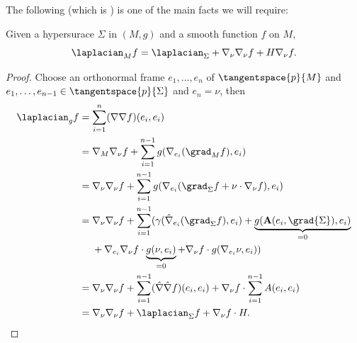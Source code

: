 \documentclass[titlepage,numbers=noenddot,headinclude,oneside,%
footinclude=true,cleardoublepage=empty,%
BCOR=5mm,paper=a4,fontsize=11pt,%
english,%
]{scrartcl}
\begin{document}
{The following (which is \parencite[Exercise 2.3 in][]{leeGeometricRelativity2019}) is one of the main facts we will require:
\begin{fact}
    Given a hypersurace \( \Sigma \) in \( (M,g) \) and a smooth function \( f \) on \( M \),
    \begin{equation*}
        \laplacian_M f=\laplacian_\Sigma +\Mconnection_\nu\Mconnection_\nu f+H \Mconnection_\nu f.
    \end{equation*}
\end{fact}
\begin{proof}
    Choose an orthonormal frame \( e_1,\dotsc,e_n \) of \( \tangentspace{p}{M} \) and \( e_1,\dotsc,e_{n-1}\in \tangentspace{p}{\Sigma} \) and \( e_n=\nu \), then
    \begin{align*}
        \laplacian_g f&=\sum_{i=1}^{n}(\Mconnection\Mconnection f)(e_i,e_i)\\
        &=\Mconnection_M \Mconnection_\nu f+\sum_{i=1}^{n-1}g(\Mconnection_{e_i} (\grad_M f),e_i)\\
        &=\Mconnection_\nu \Mconnection_\nu f+\sum_{i=1}^{n-1}g(\Mconnection_{e_i}(\grad_{\Sigma}f+\nu\cdot \Mconnection_\nu f),e_i)\\
        &=\begin{aligned}[t]
            &\Mconnection_\nu \Mconnection_\nu f+\sum_{i=1}^{n-1}(\gamma(\Sigmaconnection_{e_i}(\grad_{\Sigma} f),e_i)+\underbrace{g(\mathbf{A}(e_i,\grad{\Sigma}),e_i)}_{=0}\\
            &+\Mconnection_{
        e_i}\Mconnection_{\nu}f\cdot \underbrace{g(\nu,e_i)}_{=0}+\Mconnection_{\nu}f\cdot g(\Mconnection_{e_i}\nu,e_i))
        \end{aligned}\\
        &=\Mconnection_\nu \Mconnection_\nu f+\sum_{i=1}^{n-1}(\Sigmaconnection\Sigmaconnection f)(e_i,e_i)+\Mconnection_\nu f\cdot \sum_{i=1}^{n-1}A(e_i,e_i)\\
        &=\Mconnection_\nu \Mconnection_\nu f+\laplacian_{\Sigma}f+\Mconnection_{\nu}f\cdot H.
    \end{align*}
\end{proof}
}

\end{document}
